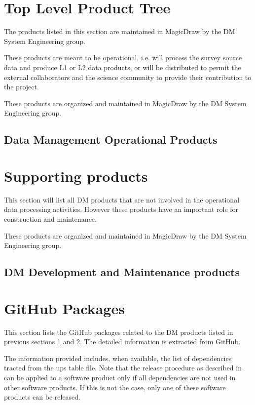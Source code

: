 \newpage
\section{Top Level Product Tree}\label{sec:top}

The products listed in this section are maintained in MagicDraw by the DM System Engineering group. 

These products are meant to be operational, i.e. will process the survey source data and produce L1 or L2 data products, or will be distributed to permit the external collaborators and the science community to provide their contribution to the project.

These products are organized and maintained in MagicDraw by the DM System Engineering group.

\newpage
\subsection{Data Management Operational Products}\label{sec:dmtop}




\newpage
\section{Supporting products}\label{sec:sups}

This section will list all DM products that are not involved in the operational data processing activities. 
However these products have an important role for construction and maintenance.

These products are organized and maintained in MagicDraw by the DM System Engineering group.
\newpage
\subsection{DM Development and Maintenance products}



\newpage
\section{GitHub Packages}\label{sec:low}

This section lists the GitHub packages related to the DM products listed in previous sections \ref{sec:top} and \ref{sec:sups}.
The detailed information is extracted from GitHub.

The information provided includes, when available, the list of dependencies tracted from the ups table file.
Note that the release procedure as described in  
can be applied to a software product only if all dependencies 
are not used in other software products. If this is not the case, only one of these software products can be released.

